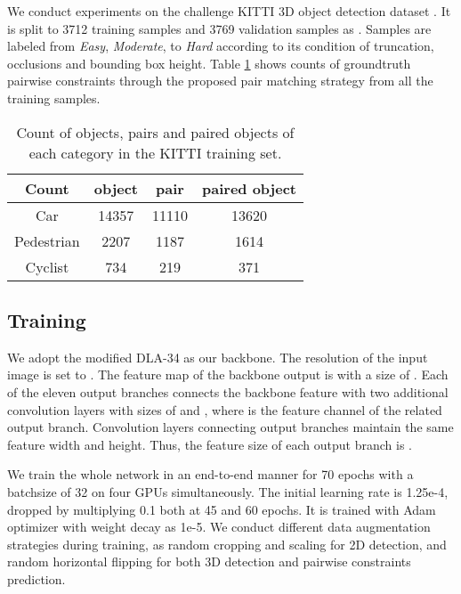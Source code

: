 \documentclass[10pt,twocolumn,letterpaper]{article}
\begin{document}
We conduct experiments on the challenge KITTI 3D object detection dataset \cite{Geiger2012CVPR}.
It is split to 3712 training samples and 3769 validation samples as \cite{chen_3d_2015}.
Samples are labeled from \textit{Easy}, \textit{Moderate}, to \textit{Hard} according to its condition of truncation, occlusions and bounding box height. Table \ref{tab:pair_count} shows counts of groundtruth pairwise constraints through the proposed pair matching strategy from all the training samples.


\begin{table}[!ht]
		\centering
		\renewcommand\arraystretch{1.0}
		\renewcommand{\tabcolsep}{3pt}
		\begin{tabular}{c|c|c|c}
			\hline
			Count&  object &  pair & paired object \\
			\hline
			Car & 14357 & 11110 &13620 \\
			Pedestrian & 2207 & 1187 &1614 \\
			Cyclist & 734 & 219 &371 \\
			\hline
		\end{tabular}
	\caption{Count of objects, pairs and paired objects of each category in the KITTI training set.}
	\label{tab:pair_count}
\end{table}



\subsection{Training}
We adopt the modified DLA-34 \cite{yu2018deep} as our backbone.
The resolution of the input image is set to .
The feature map of the backbone output is with a size of .
Each of the eleven output branches connects the backbone feature with two additional convolution layers with sizes of  and , where  is the feature channel of the related output branch.
Convolution layers connecting output branches maintain the same feature width and height. Thus, the feature size of each output branch is .

We train the whole network in an end-to-end manner for 70 epochs with a batchsize of 32 on four GPUs simultaneously.
The initial learning rate is 1.25e-4, dropped by multiplying 0.1 both at 45 and 60 epochs.
It is trained with Adam optimizer with weight decay as 1e-5. We conduct different data augmentation strategies during training, as random cropping and scaling for 2D detection, and random horizontal flipping for both 3D detection and pairwise constraints prediction.
\end{document}
